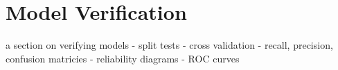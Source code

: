 
\section{Model Verification} 
\label{advanced:verification}

a section on verifying models
- split tests
- cross validation
- recall, precision, confusion matricies
- reliability diagrams
- ROC curves


